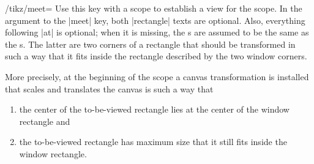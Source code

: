\begin{key}{/tikz/meet=
}
    Use this key with a scope to establish a view for the scope. In the
    argument to the |meet| key, both |rectangle| texts are optional. Also,
    everything following |at| is optional; when it is missing, the s are assumed to be the same as the s. The
    latter are two corners of a rectangle that should be transformed in such a
    way that it fits inside the rectangle described by the two window corners.

    More precisely, at the beginning of the scope a canvas transformation is
    installed that scales and translates the canvas is such a way that
    \begin{enumerate}
        \item the center of the to-be-viewed rectangle lies at the center of
            the window rectangle and
        \item the to-be-viewed rectangle has maximum size that it still fits
            inside the window rectangle.
    \end{enumerate}
\begin{codeexample}[]
\end{codeexample}
\begin{codeexample}[]
\end{codeexample}


\end{key}
